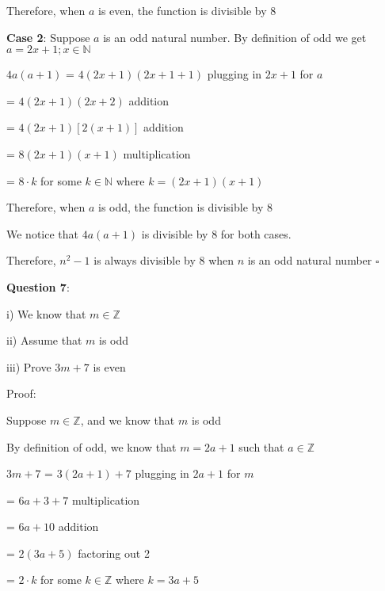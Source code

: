 \documentclass{article} %
\newcommand{\question}[2][]{\begin{flushleft}
        \textbf{Question #1}: \textit{#2}

\end{flushleft}}
\begin{document}
    Therefore, when $a$ is even, the function is divisible by 8

    \vspace*{0.2cm}

    \textbf{Case 2}: Suppose $a$ is an odd natural number. By definition of odd we get $a = 2x + 1; x \in \mathbb{N}$

    $4a(a + 1)$ = $4(2x + 1)(2x + 1+ 1)$ \tabto*{6cm}plugging in $2x + 1$ for $a$

    \tabto*{2.08cm} = $4(2x + 1)(2x + 2)$ \tabto*{6cm}addition

    \tabto*{2.08cm} = $4(2x + 1)[2(x + 1)]$ \tabto*{6cm}addition

    \tabto*{2.08cm} = $8(2x + 1)(x + 1)$ \tabto*{6cm}multiplication

    \tabto*{2.08cm} = $8\cdot k$ for some $k \in \mathbb{N}$ where $k = (2x + 1)(x + 1)$


    Therefore, when $a$ is odd, the function is divisible by 8

    \vspace*{0.3cm}

    We notice that $4a(a+1)$ is divisible by 8 for both cases.

    Therefore, $n^2 -1$ is always divisible by 8 when $n$ is an odd natural number $\square$

    \question[7]{}

    i) We know that $m \in \mathbb{Z}$

    ii) Assume that $m$ is odd

    iii) Prove $3m + 7$ is even

    \vspace*{0.3cm}
    Proof:

    Suppose $m \in \mathbb{Z}$, and we know that $m$ is odd
    
    By definition of odd, we know that $m = 2a+1$ such that $a \in \mathbb{Z}$

    $3m + 7$ = $3(2a + 1) + 7$ \tabto*{5cm}plugging in $2a + 1$ for $m$

    \tabto*{1.75cm} = $6a + 3 + 7$ \tabto*{5cm}multiplication

    \tabto*{1.75cm} = $6a + 10$ \tabto*{5cm}addition

    \tabto*{1.75cm} = $2(3a + 5)$ \tabto*{5cm}factoring out 2

    \tabto*{1.75cm} = $2\cdot k$ for some $k \in \mathbb{Z}$ where $k = 3a + 5$
\end{document}
